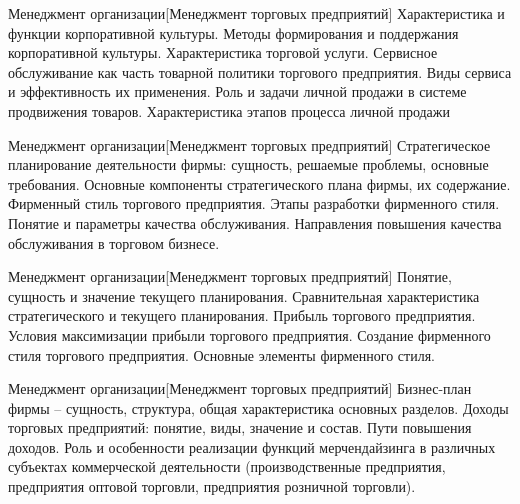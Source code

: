 \documentclass[
	11pt,
	a4paper,
	]
	{article}
\begin{document}
\vfill



\begin{minipage}[t][\miniH]{\miniL}\centering
	 {Менеджмент организации}[Менеджмент торговых предприятий]
		{
			Характеристика и функции корпоративной культуры. Методы формирования и поддержания корпоративной культуры.
		}{
			Характеристика торговой услуги. Сервисное обслуживание как часть товарной политики торгового предприятия. Виды сервиса и эффективность их применения.
		}{
			Роль и задачи личной продажи в системе продвижения товаров. Характеристика этапов процесса личной продажи
		}
	\lowGE
\end{minipage}





\begin{minipage}[t][\miniH]{\miniL}\centering
	 {Менеджмент организации}[Менеджмент торговых предприятий]
		{
			Стратегическое планирование деятельности фирмы: сущность, решаемые проблемы, основные требования. Основные компоненты стратегического плана фирмы, их содержание.
		}{
			Фирменный стиль торгового предприятия. Этапы разработки фирменного стиля.
		}{
			Понятие и параметры качества обслуживания. Направления повышения качества обслуживания в торговом бизнесе.
		}
	\lowGE
\end{minipage}

\vfill



\begin{minipage}[t][\miniH]{\miniL}\centering
	 {Менеджмент организации}[Менеджмент торговых предприятий]
		{
			Понятие, сущность и значение текущего планирования. Сравнительная характеристика стратегического и текущего планирования.
		}{
			Прибыль торгового предприятия. Условия максимизации прибыли торгового предприятия.
		}{
			Создание фирменного стиля торгового предприятия. Основные элементы фирменного стиля.
		}
	\lowGE
\end{minipage}

\vfill



\begin{minipage}[t][\miniH]{\miniL}\centering
	 {Менеджмент организации}[Менеджмент торговых предприятий]
		{
			Бизнес-план фирмы – сущность, структура, общая характеристика основных разделов.
		}{
			Доходы торговых предприятий: понятие, виды, значение и состав. Пути повышения доходов.
		}{
			Роль и особенности реализации функций мерчендайзинга в различных субъектах коммерческой деятельности (производственные предприятия, предприятия оптовой торговли, предприятия розничной торговли).
		}
	\lowGE
\end{minipage}
\end{document}
